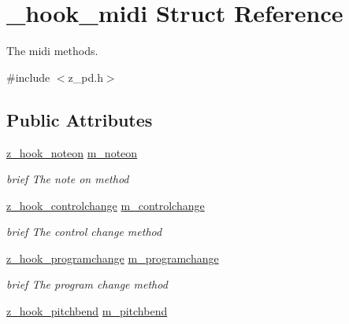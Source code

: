 \hypertarget{struct__hook__midi}{\section{\-\_\-hook\-\_\-midi Struct Reference}
\label{struct__hook__midi}
}


The midi methods.  




{\ttfamily \#include $<$z\-\_\-pd.\-h$>$}

\subsection*{Public Attributes}
\begin{DoxyCompactItemize}
\item 
\hypertarget{struct__hook__midi_a320510e3b29ca8bab5a076bde71bf479}{\hyperlink{group__zpd_gabfddab8b692c37a479828e9e92661dac}{z\-\_\-hook\-\_\-noteon} \hyperlink{struct__hook__midi_a320510e3b29ca8bab5a076bde71bf479}{m\-\_\-noteon}}\label{struct__hook__midi_a320510e3b29ca8bab5a076bde71bf479}

\begin{DoxyCompactList}\small\item\em brief The note on method \end{DoxyCompactList}\item 
\hypertarget{struct__hook__midi_aa26a118b55306a787db6b90dd059512a}{\hyperlink{group__zpd_ga1aea67cfcbc47b82082bb35e03e5b561}{z\-\_\-hook\-\_\-controlchange} \hyperlink{struct__hook__midi_aa26a118b55306a787db6b90dd059512a}{m\-\_\-controlchange}}\label{struct__hook__midi_aa26a118b55306a787db6b90dd059512a}

\begin{DoxyCompactList}\small\item\em brief The control change method \end{DoxyCompactList}\item 
\hypertarget{struct__hook__midi_a34452b94e75c843d97d762978b3402b2}{\hyperlink{group__zpd_ga88e40eb2eaa5b504135ea679bde42073}{z\-\_\-hook\-\_\-programchange} \hyperlink{struct__hook__midi_a34452b94e75c843d97d762978b3402b2}{m\-\_\-programchange}}\label{struct__hook__midi_a34452b94e75c843d97d762978b3402b2}

\begin{DoxyCompactList}\small\item\em brief The program change method \end{DoxyCompactList}\item 
\hypertarget{struct__hook__midi_a54143c9709bd5ca8e6bc028803961eb2}{\hyperlink{group__zpd_ga12ab6f5d74cb6d0852eeaf18f0698048}{z\-\_\-hook\-\_\-pitchbend} \hyperlink{struct__hook__midi_a54143c9709bd5ca8e6bc028803961eb2}{m\-\_\-pitchbend}}\label{struct__hook__midi_a54143c9709bd5ca8e6bc028803961eb2}


\end{DoxyCompactItemize}
